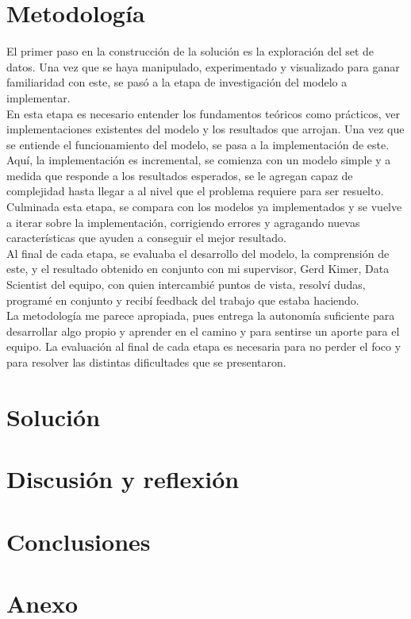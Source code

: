 \documentclass[12pt]{article}
\begin{document}
\section{Metodología}
El primer paso en la construcción de la solución es la exploración del set de datos. Una vez que se haya manipulado, experimentado y visualizado para ganar familiaridad con este, se pasó a la etapa de investigación del modelo a implementar.\\
En esta etapa es necesario entender los fundamentos teóricos como prácticos, ver implementaciones existentes del modelo y los resultados que arrojan. Una vez que se entiende el funcionamiento del modelo, se pasa a la implementación de este.\\ 
Aquí, la implementación es incremental, se comienza con un modelo simple y a medida que responde a los resultados esperados, se le agregan capaz de complejidad hasta llegar a al nivel que el problema requiere para ser resuelto.\\ 
Culminada esta etapa, se compara con los modelos ya implementados y se vuelve a iterar sobre la implementación, corrigiendo errores y agragando nuevas características que ayuden a conseguir el mejor resultado. \\

Al final de cada etapa, se evaluaba el desarrollo del modelo, la comprensión de este, y el resultado obtenido en conjunto con mi supervisor, Gerd Kimer, Data Scientist del equipo, con quien intercambié puntos de vista, resolví dudas, programé en conjunto y recibí feedback del trabajo que estaba haciendo. \\

La metodología me parece apropiada, pues entrega la autonomía suficiente para desarrollar algo propio y aprender en el camino y para sentirse un aporte para el equipo. La evaluación al final de cada etapa es necesaria para no perder el foco y para resolver las distintas dificultades que se presentaron.
\section{Solución}
\section{Discusión y reflexión}
\section{Conclusiones}
\section{Anexo}
\end{document}

